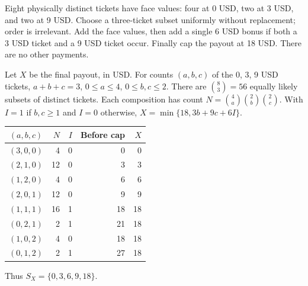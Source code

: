 \medskip
{}
Eight physically distinct tickets have face values: four at 0 USD, two at 3 USD,
and two at 9 USD. Choose a three-ticket subset uniformly without replacement;
order is irrelevant. Add the face values, then add a single 6 USD bonus if
both a 3 USD ticket and a 9 USD ticket occur. Finally cap the payout at 18 USD.
There are no other payments.
\par
Let $X$ be the final payout, in USD.
For counts $(a,b,c)$ of the 0, 3, 9 USD tickets,
$a+b+c=3$, $0\leq a\leq4$, $0\leq b,c\leq2$.
There are $\binom83=56$ equally likely subsets of distinct tickets.
Each composition has count
$N=\binom4a\binom2b\binom2c$.
With $I=1$ if $b,c\geq1$ and $I=0$ otherwise,
$X=\min\{18,3b+9c+6I\}$.
\par\noindent
\begin{minipage}[t]{.40\linewidth}
\vspace{0pt}\centering
\begin{tabular}{@{}crrrr@{}}\toprule
$(a,b,c)$ & $N$ & $I$ & Before cap & $X$\\\midrule
$(3,0,0)$ & 4 & 0 & 0 & 0\\
$(2,1,0)$ & 12 & 0 & 3 & 3\\
$(1,2,0)$ & 4 & 0 & 6 & 6\\
$(2,0,1)$ & 12 & 0 & 9 & 9\\
$(1,1,1)$ & 16 & 1 & 18 & 18\\
$(0,2,1)$ & 2 & 1 & 21 & 18\\
$(1,0,2)$ & 4 & 0 & 18 & 18\\
$(0,1,2)$ & 2 & 1 & 27 & 18\\\bottomrule
\end{tabular}
\par\raggedright Thus $S_X=\{0,3,6,9,18\}$.
\end{minipage}\hfill
\begin{minipage}[t]{.57\linewidth}
\vspace{0pt}\centering
{}
\end{minipage}\par
